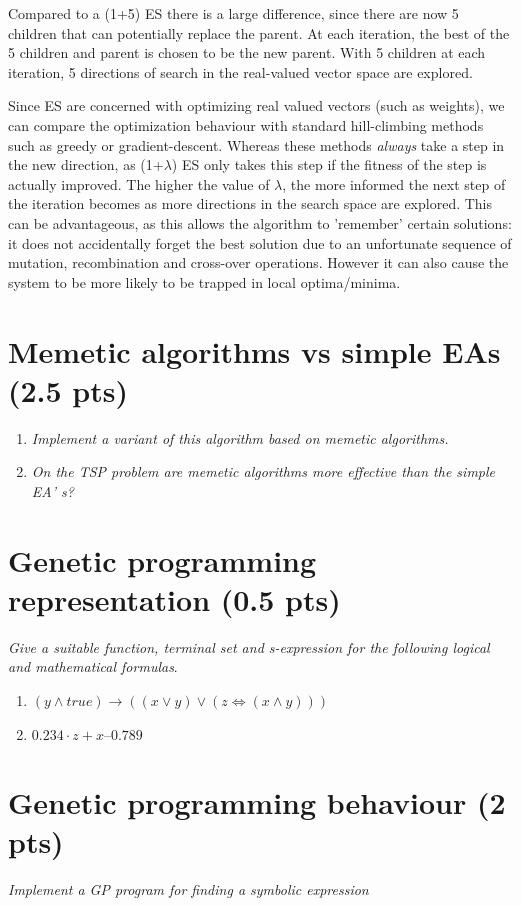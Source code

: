 \documentclass{article}
\begin{document}
Compared to a (1+5) ES there is a large difference, since there are now 5 children that can potentially replace the parent. At each iteration, the best of the 5 children and parent is chosen to be the new parent. With 5 children at each iteration, 5 directions of search in the real-valued vector space are explored.

Since ES are concerned with optimizing real valued vectors (such as weights), we can compare the optimization behaviour with standard hill-climbing methods such as greedy or gradient-descent. Whereas these methods \textit{always} take a step in the new direction, as (1+$\lambda$) ES only takes this step if the fitness of the step is actually improved. The higher the value of $\lambda$, the more informed the next step of the iteration becomes as more directions in the search space are explored. This can be advantageous, as this allows the algorithm to 'remember' certain solutions: it does not accidentally forget the best solution due to an unfortunate sequence of mutation, recombination and cross-over operations. However it can also cause the system to be more likely to be trapped in local optima/minima. 


\section{Memetic algorithms vs simple EAs (2.5 pts)}
\begin{enumerate}[label=\alph*)]
    \item \textit{Implement a variant of this algorithm based on memetic algorithms.} \\

    \item \textit{On the TSP problem are memetic algorithms more effective than the simple EA’ s? } \\
\end{enumerate}

\section{Genetic programming representation (0.5 pts)}
\textit{Give a suitable function, terminal
set and s-expression for the following logical and mathematical formulas}.
\begin{enumerate}[label=\alph*)]
    \item $(y \land true) \to ((x \lor y) \lor (z \iff (x \land y)))$ \\
    \item $0.234 \cdot z + x–0.789$
\end{enumerate}

\section{Genetic programming behaviour (2 pts)}
\textit{Implement a GP program for finding a
symbolic expression } \\ 
\end{document}
